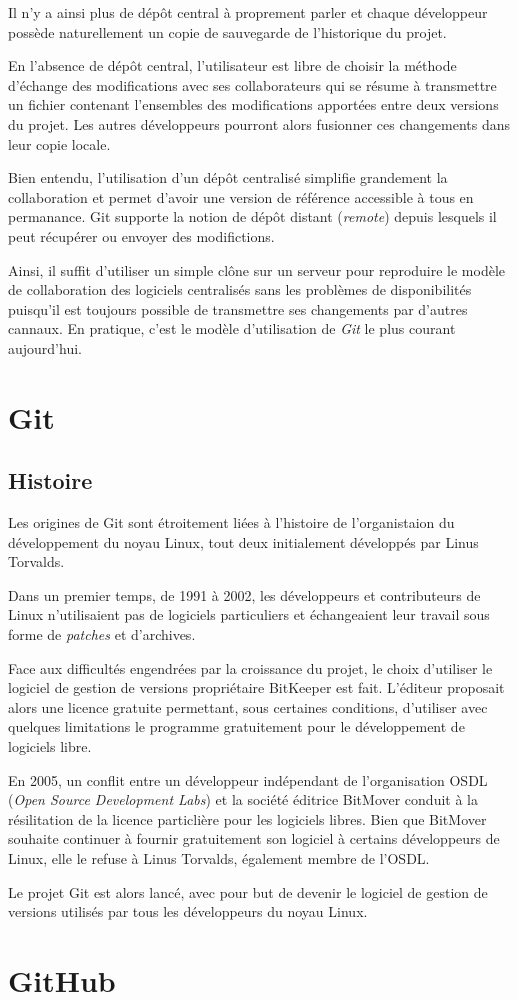 \documentclass[11pt,a4paper]{article}
\begin{document}
Il n'y a ainsi plus de dépôt central à proprement parler et chaque développeur possède naturellement un copie de sauvegarde de l'historique du projet.

En l'absence de dépôt central, l'utilisateur est libre de choisir la méthode d'échange des modifications avec ses collaborateurs qui se résume à transmettre un fichier contenant l'ensembles des modifications apportées entre deux versions du projet. Les autres développeurs pourront alors fusionner ces changements dans leur copie locale.

Bien entendu, l'utilisation d'un dépôt centralisé simplifie grandement la collaboration et permet d'avoir une version de référence accessible à tous en permanance. Git supporte la notion de dépôt distant (\textit{remote}) depuis lesquels il peut récupérer ou envoyer des modifictions.

Ainsi, il suffit d'utiliser un simple clône sur un serveur pour reproduire le modèle de collaboration des logiciels centralisés sans les problèmes de disponibilités puisqu'il est toujours possible de transmettre ses changements par d'autres cannaux. En pratique, c'est le modèle d'utilisation de \textit{Git} le plus courant aujourd'hui.

\section{Git}

\subsection{Histoire}

Les origines de Git sont étroitement liées à l'histoire de l'organistaion du développement du noyau Linux, tout deux initialement développés par Linus Torvalds.

Dans un premier temps, de 1991 à 2002, les développeurs et contributeurs de Linux n'utilisaient pas de logiciels particuliers et échangeaient leur travail sous forme de \textit{patches} et d'archives.

Face aux difficultés engendrées par la croissance du projet, le choix d'utiliser le logiciel de gestion de versions propriétaire BitKeeper est fait. L'éditeur proposait alors une licence gratuite permettant, sous certaines conditions, d'utiliser avec quelques limitations le programme gratuitement pour le développement de logiciels libre.

En 2005, un conflit entre un développeur indépendant de l'organisation OSDL (\textit{Open Source Development Labs}) et la société éditrice BitMover conduit à la résilitation de la licence particlière pour les logiciels libres. Bien que BitMover souhaite continuer à fournir gratuitement son logiciel à certains développeurs de Linux, elle le refuse à Linus Torvalds, également membre de l'OSDL.

Le projet Git est alors lancé, avec pour but de devenir le logiciel de gestion de versions utilisés par tous les développeurs du noyau Linux.

\section{GitHub}
\end{document}
